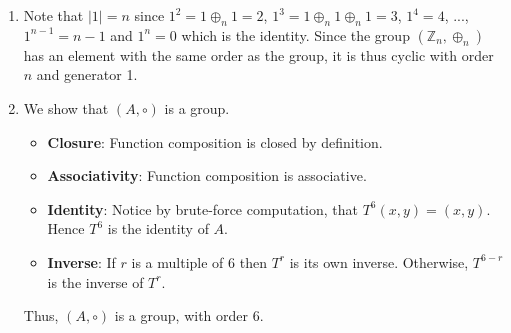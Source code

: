 \begin{enumerate}
    \item Note that $|1| = n$ since $1^2 = 1 \oplus_n 1 = 2$, $1^3 = 1 \oplus_n 1 \oplus_n 1 = 3$, $1^4 = 4$, ..., $1^{n-1} = n-1$ and $1^n = 0$ which is the identity. Since the group $(\mathbb{Z}_n, \oplus_n)$ has an element with the same order as the group, it is thus cyclic with order $n$ and generator 1.

    \item We show that $(A, \circ)$ is a group.
    \begin{itemize}
            \item \textbf{Closure}: Function composition is closed by definition.
            \item \textbf{Associativity}: Function composition is associative.
            \item \textbf{Identity}: Notice by brute-force computation, that $T^6(x, y) = (x, y)$. Hence $T^6$ is the identity of $A$.
            \item \textbf{Inverse}: If $r$ is a multiple of 6 then $T^r$ is its own inverse. Otherwise, $T^{6-r}$ is the inverse of $T^r$.
    \end{itemize}
    Thus, $(A, \circ)$ is a group, with order 6.
\end{enumerate}

